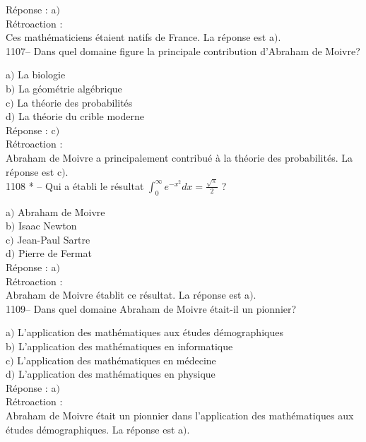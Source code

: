 ﻿\documentclass[letterpaper, 12pt]{article}
\begin{document}
R\'eponse : a$)$\\

R\'etroaction :\\
Ces math\'ematiciens \'etaient natifs de France.
La r\'eponse est a$)$.\\

1107-- Dans quel domaine figure la principale contribution d'Abraham
de Moivre?

a$)$ La biologie  \\
b$)$ La g\'eom\'etrie alg\'ebrique \\
c$)$ La th\'eorie des probabilit\'es  \\
d$)$ La th\'eorie du crible moderne\\

R\'eponse : c$)$\\

R\'etroaction :\\
Abraham de Moivre a principalement contribu\'e \`a la th\'eorie des
probabilit\'es.
La r\'eponse est c$)$.\\

1108 * -- Qui a \'etabli le r\'esultat
$\displaystyle{\int_0^{\infty}e^{-x^2}dx=\frac{\sqrt{\pi}}2}$ ?

a$)$ Abraham de Moivre  \\
b$)$ Isaac Newton \\
c$)$ Jean-Paul Sartre  \\
d$)$ Pierre de Fermat\\

R\'eponse : a$)$\\

R\'etroaction :\\
Abraham de Moivre \'etablit ce r\'esultat.
La r\'eponse est a$)$.\\

1109-- Dans quel domaine Abraham de Moivre \'etait-il un pionnier?

a$)$ L'application des math\'ematiques aux \'etudes d\'emographiques  \\
b$)$ L'application des math\'ematiques en informatique \\
c$)$ L'application des math\'ematiques en m\'edecine  \\
d$)$ L'application des math\'ematiques en physique\\

R\'eponse : a$)$\\

R\'etroaction :\\
Abraham de Moivre \'etait un pionnier dans l'application des
math\'ematiques aux \'etudes d\'emographiques.
La r\'eponse est a$)$.\\
\end{document}
